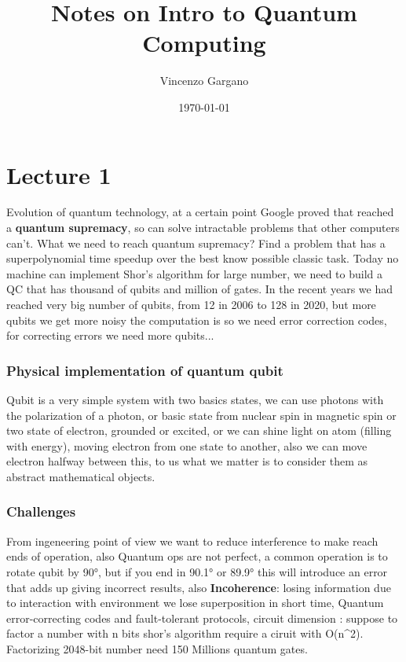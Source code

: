 \documentclass[12pt]{book}
\title{Notes on Intro to Quantum Computing}
\author{Vincenzo Gargano}
\begin{document}

\date{\today}

\maketitle

\tableofcontents
\clearpage


\chapter{Lecture 1}

Evolution of quantum technology, at a certain point Google proved that reached a \textbf{quantum supremacy}, so can solve intractable problems that other computers can't. What we need to reach quantum supremacy? Find a problem that has a superpolynomial time speedup over the best know possible classic task. Today no machine can implement Shor's algorithm for large number, we need to build a QC that has thousand of qubits and million of gates. In the recent years we had reached very big number of qubits, from 12 in 2006 to 128 in 2020, but more qubits we get more noisy the computation is so we need error correction codes, for correcting errors we need more qubits...\newline
\subsection{Physical implementation of quantum qubit}
Qubit is a very simple system with two basics states, we can use photons with the polarization of a photon, or basic state from nuclear spin in magnetic spin or two state of electron, grounded or excited, or we can shine light on atom (filling with energy), moving electron from one state to another, also we can move electron halfway between this, to us what we matter is to consider them as abstract mathematical objects.
\subsection{Challenges}
From ingeneering point of view we want to reduce interference to make reach ends of operation, also Quantum ops are not perfect, a common operation is to rotate qubit by 90°, but if you end in 90.1° or 89.9° this will introduce an error that adds up giving incorrect results, also \textbf{Incoherence}: losing information due to interaction with environment we lose superposition in short time, Quantum error-correcting codes and fault-tolerant protocols, circuit dimension : suppose to factor a number with n bits shor's algorithm require a ciruit with O(n^2).\newline
Factorizing 2048-bit number need 150 Millions quantum gates.
\end{document}
